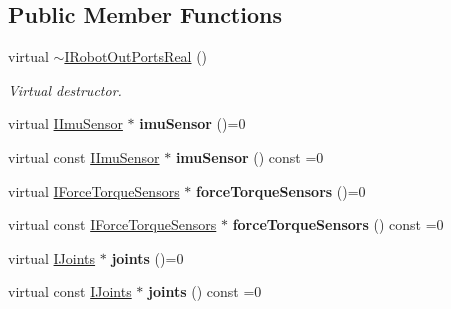 \subsection*{Public Member Functions}
\begin{DoxyCompactItemize}
\item 
virtual \hyperlink{classow__core_1_1IRobotOutPortsReal_a91e455a48af77b20a48216e47dd7a999}{$\sim$\+I\+Robot\+Out\+Ports\+Real} ()\hypertarget{classow__core_1_1IRobotOutPortsReal_a91e455a48af77b20a48216e47dd7a999}{}\label{classow__core_1_1IRobotOutPortsReal_a91e455a48af77b20a48216e47dd7a999}

\begin{DoxyCompactList}\small\item\em Virtual destructor. \end{DoxyCompactList}\item 
virtual \hyperlink{classow__core_1_1IImuSensor}{I\+Imu\+Sensor} $\ast$ {\bfseries imu\+Sensor} ()=0\hypertarget{classow__core_1_1IRobotOutPortsReal_a7ba473ab64924a9aacb0b84d532c4ed5}{}\label{classow__core_1_1IRobotOutPortsReal_a7ba473ab64924a9aacb0b84d532c4ed5}

\item 
virtual const \hyperlink{classow__core_1_1IImuSensor}{I\+Imu\+Sensor} $\ast$ {\bfseries imu\+Sensor} () const =0\hypertarget{classow__core_1_1IRobotOutPortsReal_ab3bd85b21d59a4728e7332f809a6a768}{}\label{classow__core_1_1IRobotOutPortsReal_ab3bd85b21d59a4728e7332f809a6a768}

\item 
virtual \hyperlink{classow__core_1_1IForceTorqueSensors}{I\+Force\+Torque\+Sensors} $\ast$ {\bfseries force\+Torque\+Sensors} ()=0\hypertarget{classow__core_1_1IRobotOutPortsReal_afe1083e36b6b76117495876bddf43001}{}\label{classow__core_1_1IRobotOutPortsReal_afe1083e36b6b76117495876bddf43001}

\item 
virtual const \hyperlink{classow__core_1_1IForceTorqueSensors}{I\+Force\+Torque\+Sensors} $\ast$ {\bfseries force\+Torque\+Sensors} () const =0\hypertarget{classow__core_1_1IRobotOutPortsReal_ad269f5ca4d0d06dcc26dc1049e409326}{}\label{classow__core_1_1IRobotOutPortsReal_ad269f5ca4d0d06dcc26dc1049e409326}

\item 
virtual \hyperlink{classow__core_1_1IJoints}{I\+Joints} $\ast$ {\bfseries joints} ()=0\hypertarget{classow__core_1_1IRobotOutPortsReal_a79db66bcb85982efc66f3aa5d8b34246}{}\label{classow__core_1_1IRobotOutPortsReal_a79db66bcb85982efc66f3aa5d8b34246}

\item 
virtual const \hyperlink{classow__core_1_1IJoints}{I\+Joints} $\ast$ {\bfseries joints} () const =0\hypertarget{classow__core_1_1IRobotOutPortsReal_a7b3523992c44f9207e56776fd56dadaa}{}\label{classow__core_1_1IRobotOutPortsReal_a7b3523992c44f9207e56776fd56dadaa}

\end{DoxyCompactItemize}


